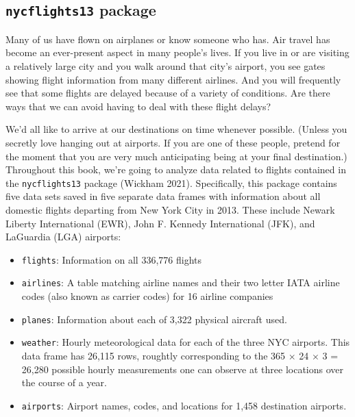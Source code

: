 \documentclass[
  letterpaper,
  DIV=11,
  numbers=noendperiod]{scrreprt}
\providecommand{\tightlist}{%
  \setlength{\itemsep}{0pt}\setlength{\parskip}{0pt}}\usepackage{longtable,booktabs,array}
\theoremstyle{definition}
\theoremstyle{remark}
\begin{document}
\hypertarget{nycflights13-package}{%
\subsection{\texorpdfstring{\texttt{nycflights13}
package}{nycflights13 package}}\label{nycflights13-package}}

Many of us have flown on airplanes or know someone who has. Air travel
has become an ever-present aspect in many people's lives. If you live in
or are visiting a relatively large city and you walk around that city's
airport, you see gates showing flight information from many different
airlines. And you will frequently see that some flights are delayed
because of a variety of conditions. Are there ways that we can avoid
having to deal with these flight delays?

We'd all like to arrive at our destinations on time whenever possible.
(Unless you secretly love hanging out at airports. If you are one of
these people, pretend for the moment that you are very much anticipating
being at your final destination.) Throughout this book, we're going to
analyze data related to flights contained in the \texttt{nycflights13}
package (Wickham 2021). Specifically, this package contains five data
sets saved in five separate data frames with information about all
domestic flights departing from New York City in 2013. These include
Newark Liberty International (EWR), John F. Kennedy International (JFK),
and LaGuardia (LGA) airports:

\begin{itemize}
\tightlist
\item
  \texttt{flights}: Information on all 336,776 flights
\item
  \texttt{airlines}: A table matching airline names and their two letter
  IATA airline codes (also known as carrier codes) for 16 airline
  companies
\item
  \texttt{planes}: Information about each of 3,322 physical aircraft
  used.
\item
  \texttt{weather}: Hourly meteorological data for each of the three NYC
  airports. This data frame has 26,115 rows, roughtly corresponding to
  the 365 \(\times\) 24 \(\times\) 3 = 26,280 possible hourly
  measurements one can observe at three locations over the course of a
  year.
\item
  \texttt{airports}: Airport names, codes, and locations for 1,458
  destination airports.
\end{itemize}
\end{document}

